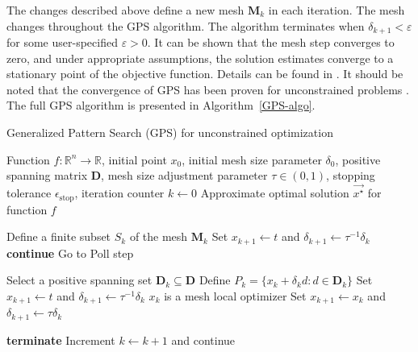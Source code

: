 The changes described above define a new mesh $ \mathbf{M} _k $ in each iteration. The mesh changes throughout the GPS algorithm. The algorithm terminates when $ \delta_{k+1} < \varepsilon $ for some user-specified $ \varepsilon > 0 $. It can be shown that the mesh step converges to zero, and under appropriate assumptions, the solution estimates converge to a stationary point of the objective function. Details can be found in \cite{BBO-textbook}. It should be noted that the convergence of GPS has been proven for unconstrained problems \cite{BBO-textbook}. The full GPS algorithm is presented in Algorithm~\ref{GPS-algo}.
\\[4pt]
\begin{algorithm}[H]
	\caption{Generalized Pattern Search (GPS) for unconstrained optimization}\label{GPS-algo}
	\begin{algorithmic}[1]
		\Require Function $f: \mathbb{R}^n \to \mathbb{R}$, initial point $x_0$, initial mesh size parameter $\delta_0$, positive spanning matrix $\mathbf{D}$, mesh size adjustment parameter $\tau \in (0, 1)$, stopping tolerance $\epsilon_{\text{stop}}$, iteration counter $k \gets 0$
		\Ensure Approximate optimal solution $\vec{x^{\star}}$ for function $f$
		
		
		
		\State Define a finite subset $S_k$ of the mesh $\mathbf{M}_k$
		\State Set $x_{k+1} \gets t$ and $\delta_{k+1} \gets \tau^{-1} \delta_k$
		\State \textbf{continue}
		\Else
		\State Go to Poll step
		\EndIf
		
		\State Select a positive spanning set $\mathbf{D}_k \subseteq \mathbf{D}$
		\State Define $P_k = \{x_k + \delta_k d : d \in \mathbf{D}_k\}$
		\State Set $x_{k+1} \gets t$ and $\delta_{k+1} \gets \tau^{-1} \delta_k$
		\Else
		\State $x_k$ is a mesh local optimizer
		\State Set $x_{k+1} \gets x_k$ and $\delta_{k+1} \gets \tau \delta_k$
		\EndIf
		
		\State \textbf{terminate}
		\Else
		\State Increment $k \gets k+1$ and continue
		\EndIf
		
		\EndWhile
		\EndProcedure
	\end{algorithmic}
\end{algorithm}

